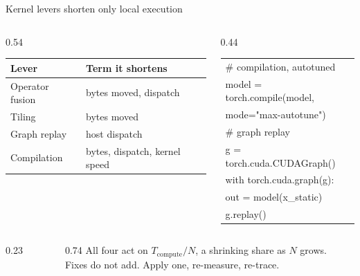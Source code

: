 \documentclass[aspectratio=169, 12pt]{beamer}
\begin{document}
\begin{frame}{Kernel levers shorten only local execution}
  \begin{columns}[T]
  \begin{column}{0.54\textwidth}
  \small
  \renewcommand{\arraystretch}{1.3}
  \begin{tabular}{@{}ll@{}}
    \toprule
    \textbf{Lever} & \textbf{Term it shortens} \\
    \midrule
    Operator fusion & bytes moved, dispatch \\
    Tiling & bytes moved \\
    Graph replay & host dispatch \\
    Compilation & bytes, dispatch, kernel speed \\
    \bottomrule
  \end{tabular}
  \end{column}
  \begin{column}{0.44\textwidth}
  \small\ttfamily\bfseries
  \begin{tabular}{@{}l@{}}
  \textcolor{midgray}{\# compilation, autotuned}\\
  model = torch.compile(model,\\
  \hspace*{4em}mode="max-autotune")\\
  \textcolor{midgray}{\# graph replay}\\
  g = torch.cuda.CUDAGraph()\\
  with torch.cuda.graph(g):\\
  \hspace*{2em}out = model(x\_static)\\
  g.replay()
  \end{tabular}
  \end{column}
  \end{columns}
  \vspace{0.12cm}
  \begin{columns}[c]
    \begin{column}{0.23\textwidth}
      \centering{}
    \end{column}
    \begin{column}{0.74\textwidth}
      {\normalsize All four act on $T_{\text{compute}}/N$, a shrinking share as $N$ grows.}\\[0.08cm]
      {\normalsize Fixes do not add. Apply one, re-measure, re-trace.}
    \end{column}
  \end{columns}

\end{frame}
\end{document}
